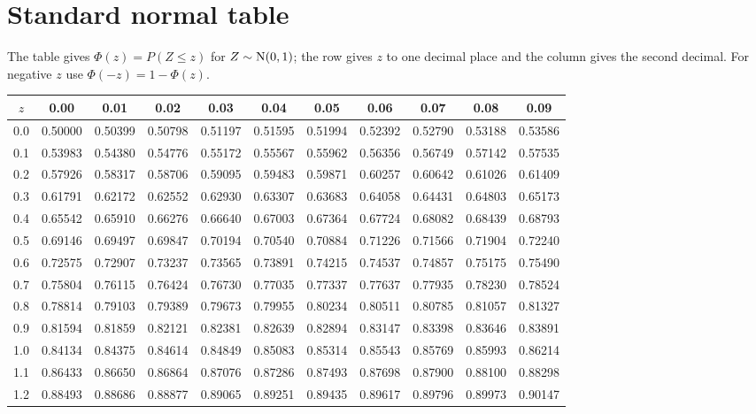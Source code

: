 \section{Standard normal table}

The table gives $\Phi(z) = P(Z\le z)$ for $Z\sim\operatorname{N}(0,1)$; the row gives $z$ to one
decimal place and the column gives the second decimal. For negative $z$ use
$\Phi(-z) = 1-\Phi(z)$.

\begin{center}
\footnotesize
\begin{tabular}{c|cccccccccc}
$z$ & 0.00 & 0.01 & 0.02 & 0.03 & 0.04 & 0.05 & 0.06 & 0.07 & 0.08 & 0.09 \\
\hline
0.0 & 0.50000 & 0.50399 & 0.50798 & 0.51197 & 0.51595 & 0.51994 & 0.52392 & 0.52790 & 0.53188 & 0.53586 \\
0.1 & 0.53983 & 0.54380 & 0.54776 & 0.55172 & 0.55567 & 0.55962 & 0.56356 & 0.56749 & 0.57142 & 0.57535 \\
0.2 & 0.57926 & 0.58317 & 0.58706 & 0.59095 & 0.59483 & 0.59871 & 0.60257 & 0.60642 & 0.61026 & 0.61409 \\
0.3 & 0.61791 & 0.62172 & 0.62552 & 0.62930 & 0.63307 & 0.63683 & 0.64058 & 0.64431 & 0.64803 & 0.65173 \\
0.4 & 0.65542 & 0.65910 & 0.66276 & 0.66640 & 0.67003 & 0.67364 & 0.67724 & 0.68082 & 0.68439 & 0.68793 \\
0.5 & 0.69146 & 0.69497 & 0.69847 & 0.70194 & 0.70540 & 0.70884 & 0.71226 & 0.71566 & 0.71904 & 0.72240 \\
0.6 & 0.72575 & 0.72907 & 0.73237 & 0.73565 & 0.73891 & 0.74215 & 0.74537 & 0.74857 & 0.75175 & 0.75490 \\
0.7 & 0.75804 & 0.76115 & 0.76424 & 0.76730 & 0.77035 & 0.77337 & 0.77637 & 0.77935 & 0.78230 & 0.78524 \\
0.8 & 0.78814 & 0.79103 & 0.79389 & 0.79673 & 0.79955 & 0.80234 & 0.80511 & 0.80785 & 0.81057 & 0.81327 \\
0.9 & 0.81594 & 0.81859 & 0.82121 & 0.82381 & 0.82639 & 0.82894 & 0.83147 & 0.83398 & 0.83646 & 0.83891 \\
1.0 & 0.84134 & 0.84375 & 0.84614 & 0.84849 & 0.85083 & 0.85314 & 0.85543 & 0.85769 & 0.85993 & 0.86214 \\
1.1 & 0.86433 & 0.86650 & 0.86864 & 0.87076 & 0.87286 & 0.87493 & 0.87698 & 0.87900 & 0.88100 & 0.88298 \\
1.2 & 0.88493 & 0.88686 & 0.88877 & 0.89065 & 0.89251 & 0.89435 & 0.89617 & 0.89796 & 0.89973 & 0.90147 \\

\end{tabular}
\end{center}
